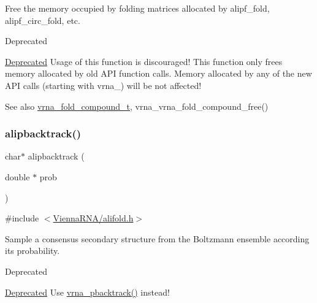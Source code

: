 Free the memory occupied by folding matrices allocated by alipf\+\_\+fold, alipf\+\_\+circ\+\_\+fold, etc. 

\begin{DoxyRefDesc}{Deprecated}
\item[\hyperlink{deprecated__deprecated000022}{Deprecated}]Usage of this function is discouraged! This function only free\textquotesingle{}s memory allocated by old A\+PI function calls. Memory allocated by any of the new A\+PI calls (starting with vrna\+\_\+) will be not affected!\end{DoxyRefDesc}


\begin{DoxySeeAlso}{See also}
\hyperlink{group__fold__compound_ga1b0cef17fd40466cef5968eaeeff6166}{vrna\+\_\+fold\+\_\+compound\+\_\+t}, vrna\+\_\+vrna\+\_\+fold\+\_\+compound\+\_\+free() 
\end{DoxySeeAlso}
\mbox{\label{group__part__func__global__deprecated_ga0df40248788f0fb17ebdc59d74116d1c}} 
\subsubsection{\texorpdfstring{alipbacktrack()}{alipbacktrack()}}
{\footnotesize\ttfamily char$\ast$ alipbacktrack (\begin{DoxyParamCaption}\item[{double $\ast$}]{prob }\end{DoxyParamCaption})}



{\ttfamily \#include $<$\hyperlink{alifold_8h}{Vienna\+R\+N\+A/alifold.\+h}$>$}



Sample a consensus secondary structure from the Boltzmann ensemble according its probability. 

\begin{DoxyRefDesc}{Deprecated}
\item[\hyperlink{deprecated__deprecated000023}{Deprecated}]Use \hyperlink{group__subopt__stochbt_ga901fe42a33b07be083421741bf7dc610}{vrna\+\_\+pbacktrack()} instead!\end{DoxyRefDesc}



